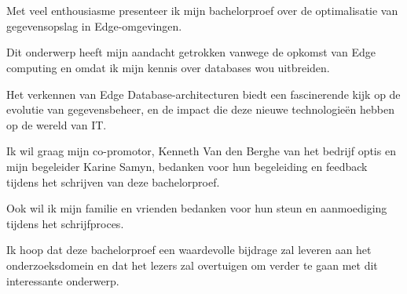 
\chapter*{}%
\label{ch:voorwoord}


Met veel enthousiasme presenteer ik mijn bachelorproef over de optimalisatie van gegevensopslag in Edge-omgevingen.

Dit onderwerp heeft mijn aandacht getrokken vanwege de opkomst van Edge computing en omdat ik mijn kennis over databases wou uitbreiden.

Het verkennen van Edge Database-architecturen biedt een fascinerende kijk op de evolutie van gegevensbeheer, en de impact die deze nieuwe technologieën hebben op de wereld van IT.

Ik wil graag mijn co-promotor, Kenneth Van den Berghe van het bedrijf optis en mijn begeleider Karine Samyn, bedanken voor hun begeleiding en feedback tijdens het schrijven van deze bachelorproef.

Ook wil ik mijn familie en vrienden bedanken voor hun steun en aanmoediging tijdens het schrijfproces.

Ik hoop dat deze bachelorproef een waardevolle bijdrage zal leveren aan het onderzoeksdomein en dat het lezers zal overtuigen om verder te gaan met dit interessante onderwerp.
